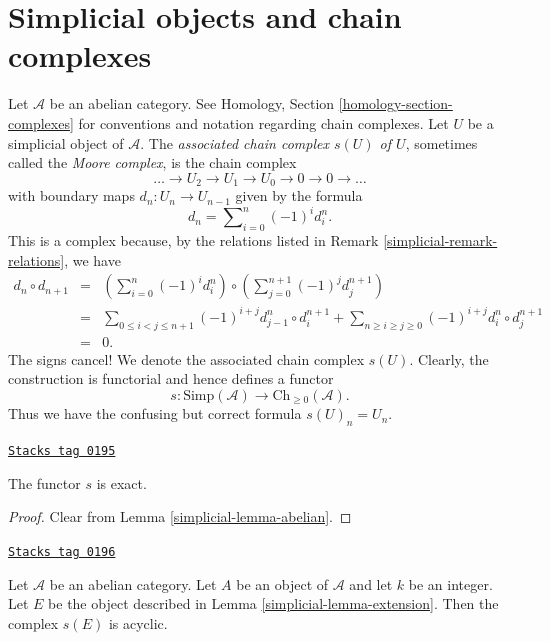 \section{Simplicial objects and chain complexes}
\label{simplicial-section-complexes}
Let $\mathcal{A}$ be an abelian category. See
Homology, Section \ref{homology-section-complexes}
for conventions and notation regarding chain
complexes.
Let $U$ be a simplicial object of $\mathcal{A}$.
The {\it associated chain complex $s(U)$ of $U$},
sometimes called the {\it Moore complex}, is
the chain complex
$$
\ldots \to U_2 \to U_1 \to U_0 \to 0 \to 0 \to \ldots
$$
with boundary maps $d_n : U_n \to U_{n - 1}$
given by the formula
$$
d_n = \sum\nolimits_{i = 0}^n (-1)^i d^n_i.
$$
This is a complex because, by the relations listed
in Remark \ref{simplicial-remark-relations}, we have
\begin{eqnarray*}
d_n \circ d_{n + 1}
& = &
(\sum\nolimits_{i = 0}^n (-1)^i d^n_i) \circ
(\sum\nolimits_{j = 0}^{n + 1} (-1)^j d^{n + 1}_j) \\
& = &
\sum\nolimits_{0 \leq i < j \leq n + 1}
(-1)^{i + j} d^n_{j - 1} \circ d^{n + 1}_i
+
\sum\nolimits_{n \geq i \geq j \geq 0}
(-1)^{i + j} d^n_i \circ d^{n + 1}_j \\
& = & 0.
\end{eqnarray*}
The signs cancel! We denote the associated chain complex
$s(U)$. Clearly, the construction is functorial
and hence defines a functor
$$
s : \text{Simp}(\mathcal{A}) \longrightarrow \text{Ch}_{\geq 0}(\mathcal{A}).
$$
Thus we have the confusing but correct formula $s(U)_n = U_n$.

\begin{lemma}[S exact]
\label{simplicial-lemma-s-exact}
\href{https://stacks.math.columbia.edu/tag/0195}{\texttt{Stacks tag 0195}}

The functor $s$ is exact.
\end{lemma}

\begin{proof}

Clear from Lemma \ref{simplicial-lemma-abelian}.
\end{proof}

\begin{lemma}
\label{simplicial-lemma-homology-extension}
\href{https://stacks.math.columbia.edu/tag/0196}{\texttt{Stacks tag 0196}}

Let $\mathcal{A}$ be an abelian category.
Let $A$ be an object of $\mathcal{A}$ and
let $k$ be an integer. Let $E$ be the object
described in Lemma \ref{simplicial-lemma-extension}.
Then the complex $s(E)$ is acyclic.
\end{lemma}

